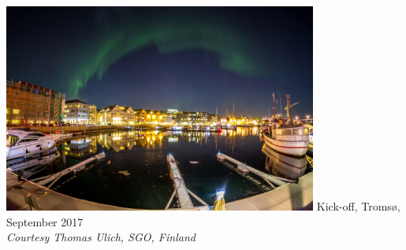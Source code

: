 \begin{frame}[fragile,t]
\frametitle{\hfill}
\vspace{\mytopbit}
\begin{center}
\includegraphics[height=2.7in]{20170907-EOS6D-IMG_5646s.jpg}
\vfill
    {\colblack \ED Kick-off, Troms{\o}, September 2017} \\
    {\it Courtesy Thomas Ulich, SGO, Finland}
\end{center}
\end{frame}
